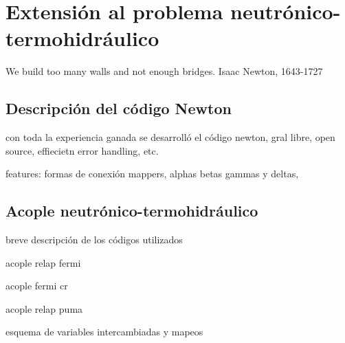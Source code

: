 \chapter{Extensión al problema neutrónico-termohidráulico}
\label{chap5}
\chapterquote
{We build too many walls and not enough bridges.}
{Isaac Newton, 1643-1727}

\section{Descripción del código Newton}
\label{5:newton}

con toda la experiencia ganada se desarrolló el código newton, gral
libre, open source, effiecietn error handling, etc.

features:
formas de conexión
mappers, 
alphas betas gammas y deltas,


\section{Acople neutrónico-termohidráulico}
\label{5:neut-th}
breve descripción de los códigos utilizados

acople relap fermi

acople fermi cr

acople relap puma

esquema de variables intercambiadas y mapeos
